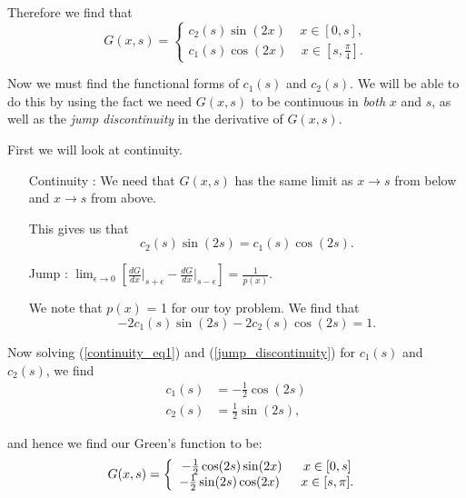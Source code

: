 Therefore we find that 
$$G(x,s) = \left\{ \begin{array}{c}
c_2(s) \sin(2x)  \ \ \ \ \  x\in[0,s], \\
c_1(s) \cos(2x) \ \ \ \ \  x\in[s,\frac{\pi}{4}].
\end{array} \right. $$

Now we must find the functional forms of $c_1(s)$ and $c_2(s)$. We will be able to do this by using the fact we need $G(x,s)$ to be continuous in \emph{both} $x$ and $s$, as well as the \emph{jump discontinuity} in the derivative of $G(x,s)$.

First we will look at continuity. 
\begin{itemize}
\item[Continuity]: We need that $G(x,s)$ has the same limit as $x\rightarrow s$ from below and $x\rightarrow s$ from above.

This gives us that
\begin{equation}
\label{continuity_eq1} c_2(s) \sin(2s) = c_1(s) \cos(2s).
\end{equation}

\item[Jump]:  $\lim_{\epsilon\rightarrow0} \left[ \frac{dG}{dx}\Bigg|_{s+\epsilon} -  \frac{dG}{dx}\Bigg|_{s-\epsilon}   \right] = \frac{1}{p(x)}$.

We note that $p(x)$ = 1 for our toy problem. We find that
\begin{equation}
\label{jump_discontinuity} -2c_1(s) \sin(2s) - 2c_2(s) \cos(2s) = 1.
\end{equation}

\end{itemize}

Now solving (\ref{continuity_eq1}) and (\ref{jump_discontinuity}) for $c_1(s)$ and $c_2(s)$, we find
\begin{align}
c_1(s) &= -\frac{1}{2}\cos(2s)  \\
c_2(s) &= \frac{1}{2}\sin(2s),
\end{align}

and hence we find our Green's function to be:
\begin{equation}
\label{Green_example_sol} G(x,s) = \left\{ \begin{array}{c}
-\frac{1}{2} \cos(2s) \sin(2x) \ \ \ \ \ x\in[0,s] \\
-\frac{1}{2}\sin(2s) \cos(2x)  \ \ \ \ \ x\in[s,\pi].
\end{array} \right.\\
\end{equation}

